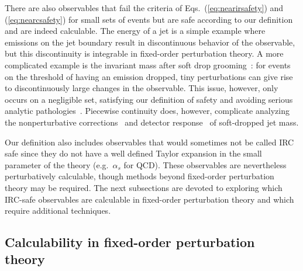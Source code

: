 \documentclass[letterpaper,11pt]{article}
\DeclareRobustCommand{\Eqs}[2]{Eqs.~(\ref{#1}) and (\ref{#2})}
\begin{document}
There are also observables that fail the criteria of \Eqs{eq:nearirsafety}{eq:nearcsafety} for small sets of events but are safe according to our definition and are indeed calculable.
%
The energy of a jet is a simple example where emissions on the jet boundary result in discontinuous behavior of the observable, but this discontinuity is integrable in fixed-order perturbation theory.
%
A more complicated example is the invariant mass after soft drop grooming~\cite{Larkoski:2014wba,Dasgupta:2013ihk}: for events on the threshold of having an emission dropped, tiny perturbations can give rise to discontinuously large changes in the observable.
%
This issue, however, only occurs on a negligible set, satisfying our definition of safety and avoiding serious analytic pathologies~\cite{Frye:2016okc,Frye:2016aiz,Marzani:2017mva,Marzani:2017kqd}.
%
Piecewise continuity does, however, complicate analyzing the nonperturbative corrections~\cite{Hoang:2019ceu} and detector response~\cite{ATL-PHYS-PUB-2019-027,Aad:2019vyi} of soft-dropped jet mass.


Our definition also includes observables that would sometimes not be called IRC safe since they do not have a well defined Taylor expansion in the small parameter of the theory (e.g.\ $\alpha_s$ for QCD).
%
These observables are nevertheless perturbatively calculable, though methods beyond fixed-order perturbation theory may be required.
%
The next subsections are devoted to exploring which IRC-safe observables are calculable in fixed-order perturbation theory and which require additional techniques.


\subsection{Calculability in fixed-order perturbation theory}
\label{sec:fopt}
\end{document}
